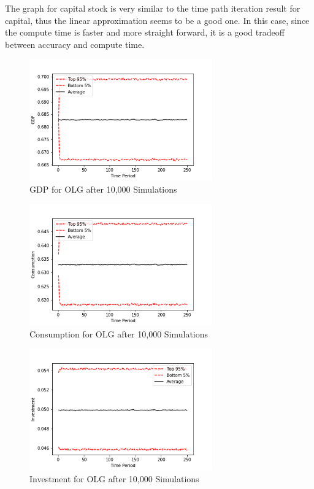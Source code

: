 \documentclass[letterpaper,11pt]{article}
\theoremstyle{definition}
\begin{document}
\begin{spacing}{1.5}
\begin{Exercise}
			The graph for capital stock is very similar to the time path iteration result for capital, thus the linear approximation seems to be a good one. In this case, since the compute time is faster and more straight forward, it is a good tradeoff between accuracy and compute time.
	\end{Exercise}

	\begin{Exercise} \label{Linear_HW_OLG_Stoch}
		\begin{figure}[H]
			\caption{GDP for OLG after 10,000 Simulations}
			\label{fig:GDP_OLG}
			\includegraphics[width=0.7\textwidth]{GDP_OLG.png}
		\end{figure}

		\begin{figure}[H]
			\caption{Consumption for OLG after 10,000 Simulations}
			\label{fig:Consumption_OLG}
			\includegraphics[width=0.7\textwidth]{Consumption_OLG.png}
		\end{figure}

		\begin{figure}[H]
			\caption{Investment for OLG after 10,000 Simulations}
			\label{fig:Investment_OLG}
			\includegraphics[width=0.7\textwidth]{Investment_OLG.png}
		\end{figure}
	\end{Exercise}


\end{spacing}
\end{document}

